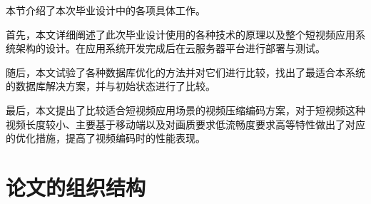 本节介绍了本次毕业设计中的各项具体工作。

首先，本文详细阐述了此次毕业设计使用的各种技术的原理以及整个短视频应用系统架构的设计。在应用系统开发完成后在云服务器平台进行部署与测试。

随后，本文试验了各种数据库优化的方法并对它们进行比较，找出了最适合本系统的数据库解决方案，并与初始状态进行了比较。

最后，本文提出了比较适合短视频应用场景的视频压缩编码方案，对于短视频这种视频长度较小、主要基于移动端以及对画质要求低流畅度要求高等特性做出了对应的优化措施，提高了视频编码时的性能表现。




\section{论文的组织结构}

